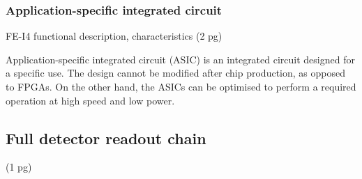 \documentclass[12pt]{mytustyle}  %
\begin{document}
\subsubsection{Application-specific integrated circuit}
FE-I4 functional description, characteristics
 (2 pg)

Application-specific integrated circuit (ASIC) is an integrated circuit designed for a specific use. The design cannot be modified after chip production, as opposed to FPGAs. On the other hand, the ASICs can be optimised to perform a required operation at high speed and low power. 

 
\subsection{Full detector readout chain}
(1 pg)


\end{document}
